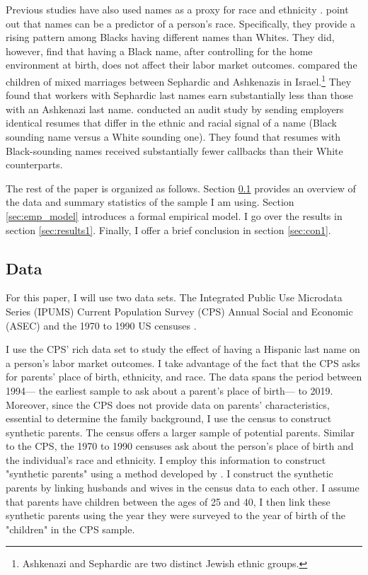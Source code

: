 \documentclass[12pt, fullpage]{article}
\begin{document}
Previous studies have also used names as a proxy for race and ethnicity \citep{fryer2004causes, rubinstein2014pride, bertrand2004emily}. \citet{fryer2004causes} point out that names can be a predictor of a person's race. Specifically, they provide a rising pattern among Blacks having different names than Whites. They did, however, find that having a Black name, after controlling for the home environment at birth, does not affect their labor market outcomes. \citet{rubinstein2014pride} compared the children of mixed marriages between Sephardic and Ashkenazis in Israel.\footnote{Ashkenazi and Sephardic are two distinct Jewish ethnic groups.} They found that workers with Sephardic last names earn substantially less than those with an Ashkenazi last name. \citet{bertrand2004emily} conducted an audit study by sending employers identical resumes that differ in the ethnic and racial signal of a name (Black sounding name versus a White sounding one). They found that resumes with Black-sounding names received substantially fewer callbacks than their White counterparts. 

The rest of the paper is organized as follows. Section \ref{sec:data1} provides an overview of the data and summary statistics of the sample I am using. Section \ref{sec:emp_model} introduces a formal empirical model. I go over the results in section \ref{sec:results1}. Finally, I offer a brief conclusion in section \ref{sec:con1}.

\subsection{Data}\label{sec:data1}

For this paper, I will use two data sets. The Integrated Public Use Microdata Series (IPUMS) Current Population Survey (CPS) Annual Social and Economic (ASEC) \citep{cps2019} and the 1970 to 1990 US censuses \citep{acs2019}. 

I use the CPS' rich data set to study the effect of having a Hispanic last name on a person's labor market outcomes. I take advantage of the fact that the CPS asks for parents' place of birth, ethnicity, and race. The data spans the period between 1994--- the earliest sample to ask about a parent's place of birth--- to 2019. Moreover, since the CPS does not provide data on parents' characteristics, essential to determine the family background, I use the census to construct synthetic parents. The census offers a larger sample of potential parents. Similar to the CPS, the 1970 to 1990 censuses ask about the person's place of birth and the individual's race and ethnicity. I employ this information to construct "synthetic parents" using a method developed by \citet{rubinstein2014pride}. I construct the synthetic parents by linking husbands and wives in the census data to each other. I assume that parents have children between the ages of 25 and 40, I then link these synthetic parents using the year they were surveyed to the year of birth of the "children" in the CPS sample.
\end{document}
